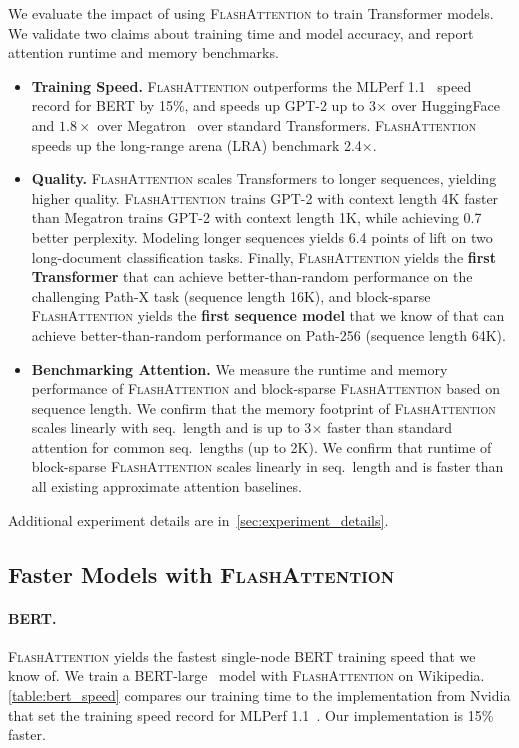 \documentclass{article}
\newcommand{\sysname}{\textsc{FlashAttention}\xspace}
\begin{document}
We evaluate the impact of using \sysname to train Transformer models.
We validate two claims about training time and model accuracy, and report attention runtime and memory benchmarks.
\begin{itemize}[itemsep=0.1pt,topsep=0pt,leftmargin=*]
    \item \textbf{Training Speed.} \sysname outperforms the MLPerf 1.1~\citep{mattson2020mlperf} speed record for BERT by 15\%, and speeds up GPT-2 up to 3$\times$ over HuggingFace~\citep{wolf-etal-2020-transformers} and $1.8\times$ over Megatron~\citep{shoeybi2019megatron} over standard Transformers.
    \sysname speeds up the long-range
    arena (LRA) benchmark 2.4$\times$. 
    \item \textbf{Quality.} \sysname scales Transformers to longer sequences, yielding higher quality. 
    \sysname trains GPT-2 with context length 4K faster
    than Megatron trains GPT-2 with context length 1K, while
    achieving 0.7 better perplexity.
    Modeling longer sequences yields 6.4 points of lift on two long-document classification tasks.
    Finally, \sysname yields the \textbf{first Transformer} that can achieve
    better-than-random performance on the challenging Path-X task (sequence
    length 16K), and block-sparse \sysname yields the \textbf{first sequence model} that we know of that can achieve better-than-random performance on Path-256 (sequence length 64K).
    \item \textbf{Benchmarking Attention.} We measure the runtime and memory performance of \sysname and block-sparse \sysname based on sequence length.
We confirm that the memory footprint of \sysname scales linearly with seq.\
length and is up to 3$\times$ faster than standard attention for common seq.\
lengths (up to 2K).
We confirm that runtime of block-sparse \sysname scales linearly in seq.\ length and is faster than all existing approximate attention baselines.
\end{itemize}
Additional experiment details are in~\cref{sec:experiment_details}.

\subsection{Faster Models with \sysname}
\label{ssec:exp_language_model}

\paragraph{BERT.}
\sysname yields the fastest single-node BERT training speed that we know of.
We train a BERT-large~\citep{devlin2018bert} model
with \sysname on Wikipedia.
\cref{table:bert_speed} compares our training time to the implementation from Nvidia that set the
training speed record for MLPerf 1.1~\citep{mattson2020mlperf}.
Our implementation is 15\% faster.
\end{document}
